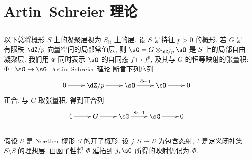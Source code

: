 \section{Artin--Schreier 理论}\label{III:3}

\subsection{}\label{III:3-1}

以下总将概形 $S$ 上的凝聚层视为 $S_\text{ét}$ 上的层. 设 $S$ 是特征 $p>0$ 的概形. 若 $G$ 是有限秩 $\dZ/p$-向量空间的局部常值层, 则 $\sG=G\otimes_{\dZ/p}\sO$ 是 $S$ 上的局部自由凝聚层. 我们用 $\Phi$ 同时表示 $\sO$ 的自同态 $f\mapsto f^p$, 及其与 $G$ 的恒等映射的张量积: $\Phi:\sG\to\sG$. Artin--Schreier 理论 \cite[IX 3.5]{sga4} 断言下列序列
\[\xymatrix{
  0 \ar[r]
    & \dZ/p \ar[r]
    & \sO \ar[r]^-{\Phi-1}
    & \sO \ar[r]
    & 0
}\]
正合. 与 $G$ 取张量积, 得到正合列
\[\xymatrix{
  0 \ar[r]
    & G \ar[r]
    & \sG \ar[r]^-{\Phi-1}
    & \sG \ar[r]
    & 0
}\]

\subsection{}\label{III:3-2}

假设 $S$ 是 Noether 概形 $\bar S$ 的开子概形. 设 $j:S\hookrightarrow \bar S$ 为包含态射, $I$ 是定义闭补集 $\bar S\setminus S$ 的理想层. 由函子性将 $\Phi$ 延拓到 $j_*\sG$ 所得的映射仍记为 $\Phi$.


